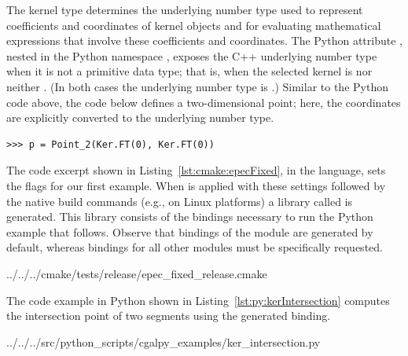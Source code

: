 The kernel type determines the underlying number type used to represent coefficients and coordinates of kernel objects and for evaluating mathematical expressions that involve these coefficients and coordinates. The Python attribute , nested in the Python namespace , exposes the C++ underlying number type when it is not a primitive data type; that is, when the selected kernel is nor  neither . (In both cases the underlying number type is .) Similar to the Python code above, the code below defines a
two-dimensional point; here, the coordinates are explicitly converted to the underlying number type.
\begin{lstlisting}[style=pythonStyle]
>>> p = Point_2(Ker.FT(0), Ker.FT(0))
\end{lstlisting}

The code excerpt shown in Listing~\ref{lst:cmake:epecFixed}, in the \cmake{} language, sets the \cmake{} flags for our first example. When  is applied with these settings followed by the native build commands (e.g.,  on Linux platforms) a library called  is generated. This library consists of the bindings necessary to run the Python example that follows. Observe that bindings of the \iiDandiiiDGeometryKernelPackage{} module are generated by default, whereas bindings for all other modules must be specifically requested.

\begin{lstfloat}
  
                  {../../../cmake/tests/release/epec_fixed_release.cmake}
\end{lstfloat}

The code example in Python shown in Listing~\ref{lst:py:kerIntersection} computes the intersection point of two segments using the generated binding.

\begin{lstfloat}
  
                  {../../../src/python_scripts/cgalpy_examples/ker_intersection.py}
\end{lstfloat}

